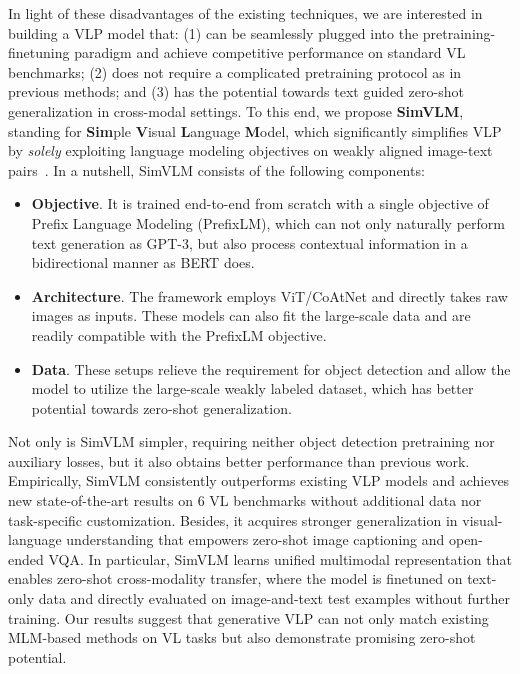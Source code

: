 \documentclass{article} \usepackage{iclr2022_conference,times}
\newcommand{\ours}{SimVLM}
\begin{document}
In light of these disadvantages of the existing techniques,
we are interested in building a VLP model that:
(1) can be seamlessly plugged into the pretraining-finetuning paradigm and achieve competitive performance on standard VL benchmarks;
(2) does not require a complicated pretraining protocol as in previous methods;
and (3) has the potential towards text guided zero-shot generalization in cross-modal settings.
To this end,
we propose \textbf{{\ours}}, standing for \textbf{Sim}ple \textbf{V}isual \textbf{L}anguage \textbf{M}odel, which significantly simplifies VLP by \textit{solely} exploiting language modeling objectives on weakly aligned image-text pairs~\citep{jia2021scaling}. In a nutshell, {\ours} consists of the following components:
\begin{itemize}
    \item \textbf{Objective}. It is trained end-to-end from scratch with a single objective of Prefix Language Modeling (PrefixLM), which can not only naturally perform text generation as GPT-3, but also process contextual information in a bidirectional manner as BERT does.
    \item \textbf{Architecture}. The framework employs ViT/CoAtNet \citep{dosovitskiy2021an,dai2021coatnet} and directly takes raw images as inputs. These models can also fit the large-scale data and are readily compatible with the PrefixLM objective.    
    \item \textbf{Data}. These setups relieve the requirement for object detection and allow the 
    model to utilize the large-scale weakly labeled dataset, which has better potential towards zero-shot generalization.
\end{itemize}

Not only is {\ours} simpler, requiring neither object detection pretraining nor auxiliary losses,
but it also obtains better performance than previous work.
Empirically,
{\ours} consistently outperforms existing VLP models and achieves new state-of-the-art results on 6 VL benchmarks without additional data nor task-specific customization.
Besides,
it acquires stronger generalization in visual-language understanding that empowers
zero-shot image captioning and open-ended VQA.
In particular, {\ours} learns unified multimodal representation that enables zero-shot cross-modality transfer,
where the model is finetuned on text-only data and directly evaluated on image-and-text test examples without further training.
Our results suggest that generative VLP can not only match existing MLM-based methods on VL tasks but also demonstrate promising zero-shot potential.
\end{document}
